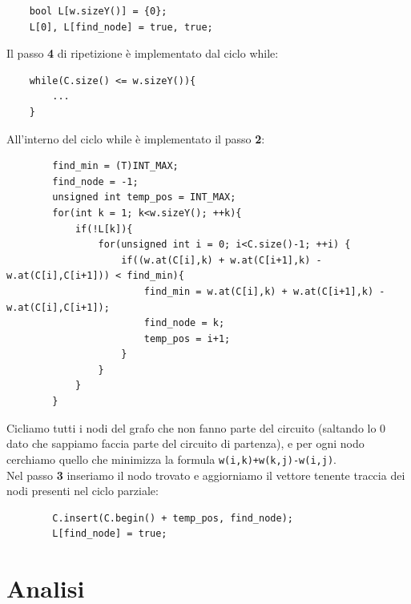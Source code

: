\documentclass[]{article}
\begin{document}
\begin{flushleft}
\begin{lstlisting}
    bool L[w.sizeY()] = {0};
    L[0], L[find_node] = true, true;
\end{lstlisting}
Il passo \textbf{4} di ripetizione è implementato dal ciclo while:
\lstset{language=c++, style=mystyle, firstnumber=14}
\begin{lstlisting}
    while(C.size() <= w.sizeY()){
   	    ...    
    }
\end{lstlisting}
All'interno del ciclo while è implementato il passo \textbf{2}:
\lstset{language=c++, style=mystyle, firstnumber=15}
\begin{lstlisting}
        find_min = (T)INT_MAX;
        find_node = -1;
        unsigned int temp_pos = INT_MAX;
        for(int k = 1; k<w.sizeY(); ++k){
            if(!L[k]){
                for(unsigned int i = 0; i<C.size()-1; ++i) {
                    if((w.at(C[i],k) + w.at(C[i+1],k) - w.at(C[i],C[i+1])) < find_min){
                        find_min = w.at(C[i],k) + w.at(C[i+1],k) - w.at(C[i],C[i+1]);
                        find_node = k;
                        temp_pos = i+1;
                    }
                }
            }
        }
\end{lstlisting}
Cicliamo tutti i nodi del grafo che non fanno parte del circuito (saltando lo 0 dato che sappiamo faccia parte del circuito di partenza), e per ogni nodo cerchiamo quello che minimizza la formula \verb|w(i,k)+w(k,j)-w(i,j)|.\\
Nel passo \textbf{3} inseriamo il nodo trovato e aggiorniamo il vettore tenente traccia dei nodi presenti nel ciclo parziale:
\lstset{language=c++, style=mystyle, firstnumber=29}
\begin{lstlisting}
        C.insert(C.begin() + temp_pos, find_node);
        L[find_node] = true;
\end{lstlisting}

\end{flushleft}
\newpage
\section{Analisi}
\end{document}
